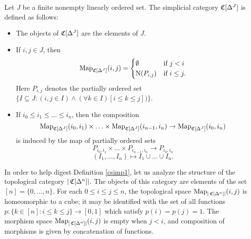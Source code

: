 \begin{definition}\label{csimp1}
Let $J$ be a finite nonempty linearly ordered set. The simplicial category
$\operatorname{\mathfrak{C}}[\Delta^J]$ is defined as follows:
\begin{itemize}
\item The objects of $\operatorname{\mathfrak{C}}[\Delta^J]$ are the elements of
$J$.

\item If $i,j \in J$, then
$$\operatorname{{Map}}_{\operatorname{\mathfrak{C}}[\Delta^J]}(i,j) = \begin{cases} \emptyset & \text{if } j < i \\
\operatorname{N}(P_{i,j}) & \text{if } i \leq j. \end{cases}$$
Here $P_{i,j}$ denotes the partially ordered set $\{ I \subseteq J: (i,j \in I) \wedge (
\forall k \in I) [i \leq k \leq j] ) \}$.

\item If $i_0 \leq i_1 \leq \ldots \leq i_n$, then the composition
$$ \operatorname{{Map}}_{\operatorname{\mathfrak{C}}[\Delta^J]}(i_0,i_1) \times \ldots \times
\operatorname{{Map}}_{\operatorname{\mathfrak{C}}[\Delta^J]}(i_{n-1},i_n) \rightarrow
\operatorname{{Map}}_{\operatorname{\mathfrak{C}}[\Delta^J]}(i_0,i_n)$$ is induced by the map of
partially ordered sets
$$ P_{i_0,i_1} \times \ldots  \times P_{i_{n-1},i_n} \rightarrow P_{i_0,i_n}$$
$$ ( I_1, \ldots, I_n ) \mapsto I_1 \cup \ldots \cup I_n.$$
\end{itemize}
\end{definition}

In order to help digest Definition \ref{csimp1}, let us analyze the structure of the
topological category $| \operatorname{\mathfrak{C}}[ \Delta^n ] |$. The objects of this category
are elements of the set $[n] = \{ 0, \ldots, n\}$. For each
$0 \leq i \leq j \leq n$, the topological space $\operatorname{{Map}}_{ |\operatorname{\mathfrak{C}}[\Delta^n]| }(i,j)$ is homeomorphic to a cube; it may be identified with the set of all functions $p: \{ k \in [n]: i \leq k \leq j \} \rightarrow [0,1]$ which satisfy $p(i) = p(j) =
1$. The morphism space $\operatorname{{Map}}_{ | \operatorname{\mathfrak{C}}[\Delta^n] |}(i,j)$ is empty when
$j < i$, and composition of morphisms is given by concatenation of functions.

